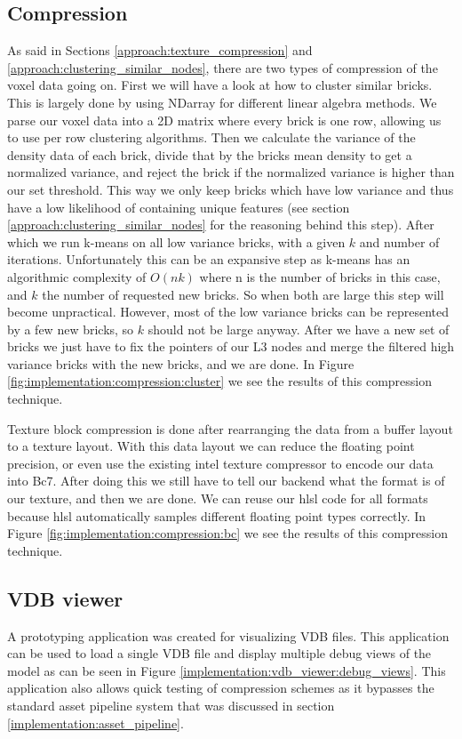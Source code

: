 \subsection{Compression} \label{implementation:compression}
As said in Sections \ref{approach:texture_compression} and \ref{approach:clustering_similar_nodes}, there are two types of compression of the voxel data going on. First we will have a look at how to cluster similar bricks. This is largely done by using NDarray \cite{NDarray} for different linear algebra methods. We parse our voxel data into a 2D matrix where every brick is one row, allowing us to use per row clustering algorithms. Then we calculate the variance of the density data of each brick, divide that by the bricks mean density to get a normalized variance, and reject the brick if the normalized variance is higher than our set threshold. This way we only keep bricks which have low variance and thus have a low likelihood of containing unique features (see section \ref{approach:clustering_similar_nodes} for the reasoning behind this step). After which we run k-means on all low variance bricks, with a given $k$ and number of iterations. Unfortunately this can be an expansive step as k-means has an algorithmic complexity of $O(nk)$ where n is the number of bricks in this case, and $k$ the number of requested new bricks. So when both are large this step will become unpractical. However, most of the low variance bricks can be represented by a few new bricks, so $k$ should not be large anyway. After we have a new set of bricks we just have to fix the pointers of our L3 nodes and merge the filtered high variance bricks with the new bricks, and we are done. In Figure \ref{fig:implementation:compression:cluster} we see the results of this compression technique.


Texture block compression is done after rearranging the data from a buffer layout to a texture layout. With this data layout we can reduce the floating point precision, or even use the existing intel texture compressor \cite{ISPCTextureCompressor} to encode our data into Bc7. After doing this we still have to tell our backend what the format is of our texture, and then we are done. We can reuse our hlsl code for all formats because hlsl automatically samples different floating point types correctly.  In Figure \ref{fig:implementation:compression:bc} we see the results of this compression technique.




\subsection{VDB viewer} \label{implementation:vdb_viewer}
A prototyping application was created for visualizing VDB files. This application can be used to load a single VDB file and display multiple debug views of the model as can be seen in Figure \ref{implementation:vdb_viewer:debug_views}. This application also allows quick testing of compression schemes as it bypasses the standard asset pipeline system that was discussed in section \ref{implementation:asset_pipeline}.

